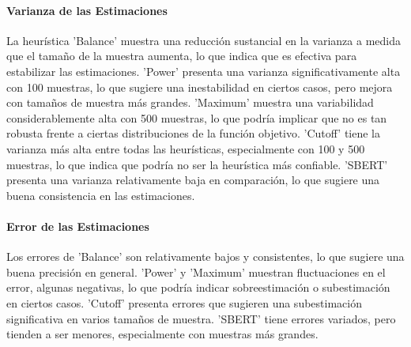 \documentclass{article}
\begin{document}
\begin{table}[H]
\centering
\caption{Analysis of the results per heuristic}
\label{table:heuristic_analysis}
\end{table}

\paragraph{Varianza de las Estimaciones}
La heurística 'Balance' muestra una reducción sustancial en la varianza a medida que el tamaño de la muestra aumenta, lo que indica que es efectiva para estabilizar las estimaciones.
'Power' presenta una varianza significativamente alta con 100 muestras, lo que sugiere una inestabilidad en ciertos casos, pero mejora con tamaños de muestra más grandes.
'Maximum' muestra una variabilidad considerablemente alta con 500 muestras, lo que podría implicar que no es tan robusta frente a ciertas distribuciones de la función objetivo.
'Cutoff' tiene la varianza más alta entre todas las heurísticas, especialmente con 100 y 500 muestras, lo que indica que podría no ser la heurística más confiable.
'SBERT' presenta una varianza relativamente baja en comparación, lo que sugiere una buena consistencia en las estimaciones.

\paragraph{Error de las Estimaciones}
Los errores de 'Balance' son relativamente bajos y consistentes, lo que sugiere una buena precisión en general.
'Power' y 'Maximum' muestran fluctuaciones en el error, algunas negativas, lo que podría indicar sobreestimación o subestimación en ciertos casos.
'Cutoff' presenta errores que sugieren una subestimación significativa en varios tamaños de muestra.
'SBERT' tiene errores variados, pero tienden a ser menores, especialmente con muestras más grandes.
\end{document}
